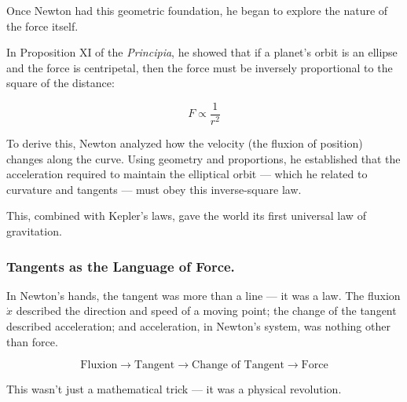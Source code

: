 Once Newton had this geometric foundation, he began to explore the nature of the force itself.

In Proposition XI of the \textit{Principia}, he showed that if a planet’s orbit is an ellipse and the force is centripetal, then the force must be inversely proportional to the square of the distance:

\[
F \propto \frac{1}{r^2}
\]

To derive this, Newton analyzed how the velocity (the fluxion of position) changes along the curve. Using geometry and proportions, he established that the acceleration required to maintain the elliptical orbit — which he related to curvature and tangents — must obey this inverse-square law.

This, combined with Kepler’s laws, gave the world its first universal law of gravitation.

\subsubsection{Tangents as the Language of Force.} 

In Newton’s hands, the tangent was more than a line — it was a law. The fluxion $\dot{x}$ described the direction and speed of a moving point; the change of the tangent described acceleration; and acceleration, in Newton’s system, was nothing other than force.

\[
\text{Fluxion} \rightarrow \text{Tangent} \rightarrow \text{Change of Tangent} \rightarrow \text{Force}
\]

This wasn’t just a mathematical trick — it was a physical revolution.


